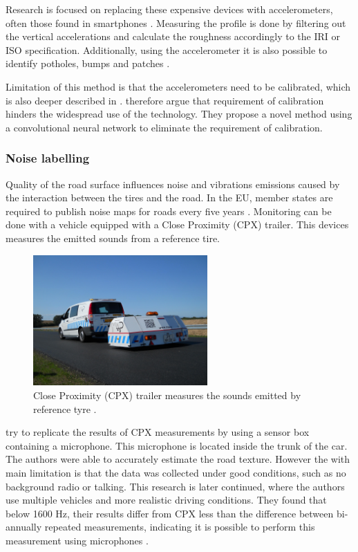 Research is focused on replacing these expensive devices with accelerometers, often those found in smartphones \cite{Hanson2014,Buttlar2014,Gupta2020}. Measuring the profile is done by filtering out the vertical accelerations and calculate the roughness accordingly to the IRI or ISO specification. Additionally, using the accelerometer it is also possible to identify potholes, bumps and patches \cite{Lekshmipathy2020}. 

Limitation of this method is that the accelerometers need to be calibrated, which is also deeper described in \cite{Gupta2020}.  therefore argue that requirement of calibration hinders the widespread use of the technology. They propose a novel method using a convolutional neural network to eliminate the requirement of calibration.




\subsubsection{Noise labelling}
Quality of the road surface influences noise and vibrations emissions caused by the interaction between the tires and the road. In the EU, member states are required to publish noise maps for roads every five years \cite{EU2002}. Monitoring can be done with a vehicle equipped with a Close Proximity (CPX) trailer. This devices measures the emitted sounds from a reference tire.

\begin{figure}[ht]
\begin{center}
\includegraphics[height=5cm,keepaspectratio]{images/2_literature/cpx-trailer.jpg}
\end{center}
\caption{Close Proximity (CPX) trailer measures the sounds emitted by reference tyre \cite{MP2020}.}
\end{figure}

 try to replicate the results of CPX measurements by using a sensor box containing a microphone. This microphone is located inside the trunk of the car. The authors were able to accurately estimate the road texture. However the with main limitation is that the data was collected under good conditions, such as no background radio or talking. This research is later continued, where the authors use multiple vehicles and more realistic driving conditions. They found that below 1600 Hz, their results differ from CPX less than the difference between bi-annually repeated measurements, indicating it is possible to perform this measurement using microphones \cite{Hauwermeiren2021}.


